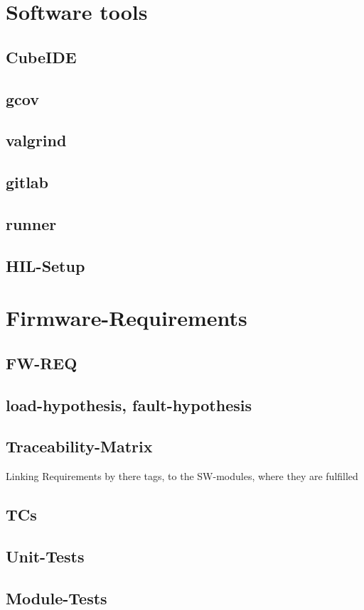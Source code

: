 \documentclass[master,english,smartquotes,apa]{hgbthesis}
\begin{document}
		\section{Software tools}
			\subsection{CubeIDE}
			\subsection{gcov}
			\subsection{valgrind}
			\subsection{gitlab}
			\subsection{runner}
			\subsection{HIL-Setup}
			
		\section{Firmware-Requirements}
			\subsection{FW-REQ}
			\subsection{load-hypothesis, fault-hypothesis}
			\subsection{Traceability-Matrix}
			Linking Requirements by there tags, to the SW-modules, where they are fulfilled
			\subsection{TCs}
			\subsection{Unit-Tests}
			\subsection{Module-Tests}
\end{document}
